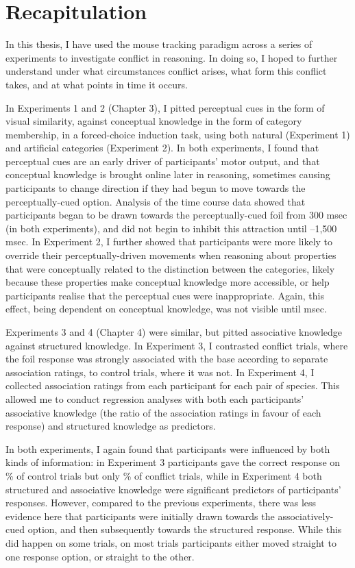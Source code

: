\section{Recapitulation}\label{sec:ch7-recap}

In this thesis, I have used the mouse tracking paradigm
across a series of experiments to investigate conflict in reasoning.
In doing so, I hoped to further understand
under what circumstances conflict arises,
what form this conflict takes,
and at what points in time it occurs.

In Experiments 1 and 2 (Chapter 3),
I pitted perceptual cues in the form of visual similarity,
against conceptual knowledge in the form of category membership,
in a forced-choice induction task,
using both natural (Experiment 1) and artificial categories (Experiment 2).
In both experiments, I found that
perceptual cues are an early driver of participants' motor output,
and that conceptual knowledge is brought online later in reasoning,
sometimes causing participants to change direction
if they had begun to move towards the perceptually-cued option.
Analysis of the time course data showed that
participants began to be drawn towards
the perceptually-cued foil from 300 msec (in both experiments),
and did not begin to inhibit this attraction until --1,500 msec.
In Experiment 2, I further showed that participants were more likely
to override their perceptually-driven movements
when reasoning about properties that were conceptually related
to the distinction between the categories,
likely because these properties make conceptual knowledge more accessible,
or help participants realise that the perceptual cues were inappropriate.
Again, this effect, being dependent on conceptual knowledge,
was not visible until  msec.

Experiments 3 and 4 (Chapter 4) were similar,
but pitted associative knowledge against structured knowledge.
In Experiment 3, I contrasted conflict trials,
where the foil response was strongly associated with the base
according to separate association ratings,
to control trials, where it was not.
In Experiment 4, I collected association ratings
from each participant for each pair of species.
This allowed me to conduct regression analyses
with both each participants' associative knowledge
(the ratio of the association ratings in favour of each response)
and structured knowledge as predictors.

In both experiments, I again found that participants were
influenced by both kinds of information:
in Experiment 3 participants gave the correct response
on \% of control trials but only \% of conflict trials,
while in Experiment 4 both structured and associative knowledge
were significant predictors of participants' responses.
However, compared to the previous experiments,
there was less evidence here that participants were
initially drawn towards the associatively-cued option,
and then subsequently towards the structured response.
While this did happen on some trials,
on most trials participants either moved straight to one response option,
or straight to the other.

